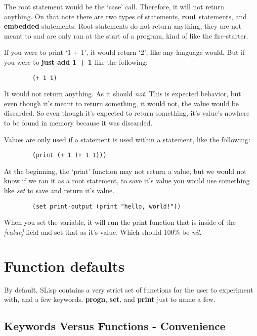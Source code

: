 \documentclass{article}
\begin{document}
	The root statement would be the `case' call. Therefore, it will not return anything. On that note there are two types of statements, \textbf{root} statements, and \textbf{embedded} statements. Root statements do not return anything, they are not meant to and are only ran at the start of a program, kind of like the fire-starter.
	
	If you were to print `1 + 1', it would return `2', like any language would.
	But if you were to \textbf{just add 1 + 1} like the following:
	
	\begin{lstlisting}
		(+ 1 1)
	\end{lstlisting}
	
	It would not return anything. As it should \emph{not}. This is expected behavior, but even though it's meant to return something, it would not, the value would be discarded. So even though it's expected to return something, it's value's nowhere to be found in memory because it was discarded.
	
	Values are only used if a statement is used within a statement, like the following:
	
	\begin{lstlisting}
		(print (+ 1 (+ 1 1)))
	\end{lstlisting}

	At the beginning, the `print' function may not return a value, but we would not know if we ran it as a root statement, to save it's value you would use something like \emph{set} to save and return it's value.
	
	\begin{lstlisting}
		(set print-output (print "hello, world!"))
	\end{lstlisting}

	When you set the variable, it will run the print function that is inside of the \emph{[value]} field and set that as it's value. Which should 100\% be \emph{nil}.
	
	
	\section{Function defaults}
	
	By default, SLisp contains a very strict set of functions for the user to experiment with, and a few keywords. \textbf{progn}, \textbf{set}, and \textbf{print} just to name a few.
	
	\subsection{Keywords Versus Functions - Convenience}
	
\end{document}
